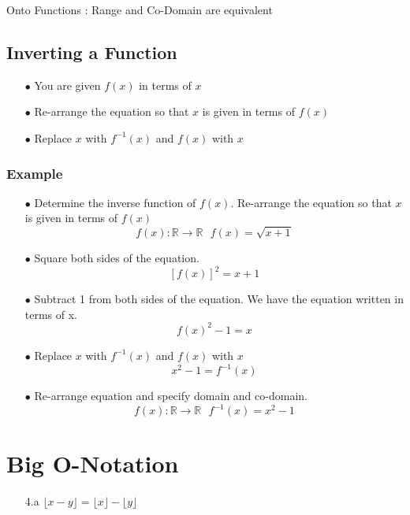 Onto Functions : Range and Co-Domain are equivalent

\subsection{Inverting a Function}

\begin{itemize}
\item[$\bullet$] You are given $f(x)$ in terms of $x$
\item[$\bullet$] Re-arrange the equation so that $x$ is given in terms of $f(x)$
\item[$\bullet$] Replace $x$ with $f^{-1}(x)$ and $f(x)$ with $x$
\end{itemize}

\subsubsection{Example}
\begin{itemize}
\item[$\bullet$]Determine the inverse function of $f(x)$. Re-arrange the equation so that $x$ is given in terms of $f(x)$
\[  f(x): \mathbb{R} \rightarrow \mathbb{R}  \mbox{   } f(x)  = \sqrt{x+1} \]
\item[$\bullet$] Square both sides of the equation.
\[[f(x)]^2 = x+1 \]
\item[$\bullet$] Subtract 1 from both sides of the equation. We have the equation written in terms of x.
\[f(x)^2-1 = x \]
\item[$\bullet$] Replace $x$ with $f^{-1}(x)$ and $f(x)$ with $x$
\[x^2-1 = f^{-1}(x) \]
\item[$\bullet$] 
Re-arrange equation and specify domain and co-domain.
\[ f(x): \mathbb{R} \rightarrow \mathbb{R}  \mbox{   }  f^{-1}(x) = x^2-1  \]
\end{itemize}
\newpage
\section{Big O-Notation}


\begin{itemize}
\item[4.a] $ \lfloor x - y \rfloor = \lfloor x \rfloor - \lfloor y \rfloor$

\end{itemize}
\newpage
